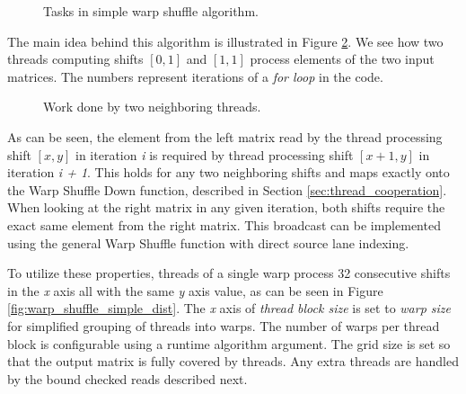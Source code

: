 \begin{figure}[ht]
	\centering
	\def\svgwidth{0.5\textwidth}
	
	\caption{Tasks in simple warp shuffle algorithm.}
	\label{fig:warp_shuffle_simple_tasks}
\end{figure}

The main idea behind this algorithm is illustrated in Figure \ref{fig:warp_shuffle_shuffle}. We see how two threads computing shifts $[0,1]$ and $[1,1]$ process elements of the two input matrices. The numbers represent iterations of a \textit{for loop} in the code.

\begin{figure}[ht]
	\centering
	\def\svgwidth{0.7\textwidth}
	
	\caption{Work done by two neighboring threads.}
	\label{fig:warp_shuffle_shuffle}
\end{figure}

As can be seen, the element from the left matrix read by the thread processing shift $[x, y]$ in iteration \textit{i} is required by thread processing shift $[x + 1,y]$ in iteration \textit{i + 1}. This holds for any two neighboring shifts and maps exactly onto the Warp Shuffle Down function, described in Section \ref{sec:thread_cooperation}. When looking at the right matrix in any given iteration, both shifts require the exact same element from the right matrix. This broadcast can be implemented using the general Warp Shuffle function with direct source lane indexing.


To utilize these properties, threads of a single warp process 32 consecutive shifts in the \textit{x} axis all with the same \textit{y} axis value, as can be seen in Figure \ref{fig:warp_shuffle_simple_dist}. The \textit{x} axis of \textit{thread block size} is set to \textit{warp size} for simplified grouping of threads into warps. The number of warps per thread block is configurable using a runtime algorithm argument. The grid size is set so that the output matrix is fully covered by threads. Any extra threads are handled by the bound checked reads described next.

